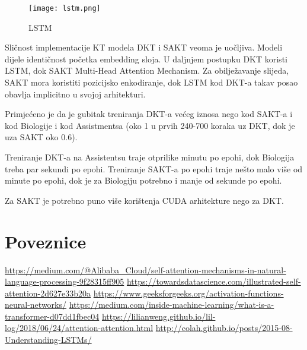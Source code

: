 	\begin{figure}[!htb]
		\centering
		\texttt{[image: lstm.png]}
		\caption{LSTM}
		\label{fig:lstm}
	\end{figure}

		Sličnost implementacije KT modela DKT i SAKT veoma je uočljiva. Modeli dijele identičnost početka embedding sloja. U daljnjem postupku DKT koristi LSTM, dok SAKT Multi-Head Attention Mechanism. Za obilježavanje slijeda, SAKT mora koristiti pozicijsko enkodiranje, dok LSTM kod DKT-a takav posao obavlja implicitno u svojoj arhitekturi.
	
		Primjećeno je da je gubitak treniranja DKT-a većeg iznosa nego kod SAKT-a i kod Biologije i kod Assistmentsa (oko 1 u prvih 240-700 koraka uz DKT, dok je uza SAKT oko 0.6). 

		Treniranje DKT-a na Assistentsu traje otprilike minutu po epohi, dok Biologija treba par sekundi po epohi.
		Treniranje SAKT-a po epohi traje nešto malo više od minute po epohi, dok je za Biologiju potrebno i manje od sekunde po epohi.

		Za SAKT je potrebno puno više korištenja CUDA arhitekture nego za DKT.

		
	\section{Poveznice}
\url{https://medium.com/@Alibaba_Cloud/self-attention-mechanisms-in-natural-language-processing-9f28315ff905}\newline
\url{https://towardsdatascience.com/illustrated-self-attention-2d627e33b20a}\newline
\url{https://www.geeksforgeeks.org/activation-functions-neural-networks/}\newline
\url{https://medium.com/inside-machine-learning/what-is-a-transformer-d07dd1fbec04}\newline
\url{https://lilianweng.github.io/lil-log/2018/06/24/attention-attention.html}\newline
\url{http://colah.github.io/posts/2015-08-Understanding-LSTMs/}\newline


